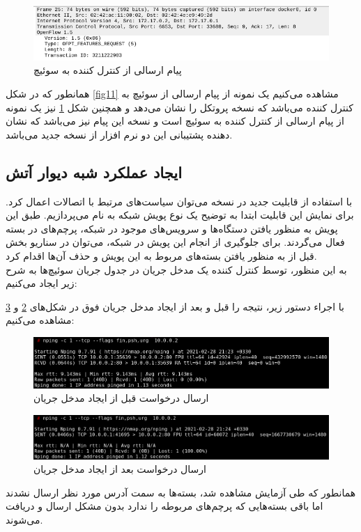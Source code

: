 \begin{figure}
	\centering
	\includegraphics[scale=0.5]{imgs/c_s_fr.png}
	\caption{پیام ارسالی  از کنترل کننده به سوئیچ}
	\label{fig12}
\end{figure}

همانطور که در شکل \ref{fig11} مشاهده می‌کنیم یک نمونه از پیام ارسالی از سوئیچ به کنترل کننده می‌باشد که نسخه پروتکل را  نشان می‌دهد و همچنین شکل \ref{fig12} نیز یک نمونه از پیام ارسالی از کنترل کننده به سوئیچ است و نسخه این پیام نیز  می‌باشد که نشان دهنده پشتیبانی این دو نرم افزار از نسخه جدید می‌باشد.

\subsection{ایجاد عملکرد شبه دیوار آتش}
با استفاده از قابلیت جدید  در نسخه  می‌توان سیاست‌های مرتبط با اتصالات  اعمال کرد. برای نمایش این قابلیت ابتدا به توضیح یک نوع پویش شبکه به نام  می‌پردازیم. طبق این پویش به منظور یافتن دستگاه‌ها و سرویس‌های موجود در شبکه، پرچم‌های  در بسته فعال می‌گردند. برای جلوگیری از انجام این پویش در شبکه، می‌توان در سناریو بخش قبل از  به منظور یافتن بسته‌های مربوط به این پویش و حذف آن‌ها اقدام کرد.\\
به این منظور، توسط کنترل کننده یک مدخل جریان در جدول جریان سوئیچ‌ها به شرح زیر ایجاد می‌کنیم:
\begin{flushleft}
\end{flushleft}
با اجراء دستور زیر، نتیجه را قبل و بعد از ایجاد مدخل جریان فوق در شکل‌های \ref{fig13} و \ref{fig14} مشاهده می‌کنیم:
\begin{flushleft}
\end{flushleft}

\begin{figure}
	\centering
	\includegraphics[scale=0.5]{imgs/tcp_b.png}
	\caption{ارسال درخواست قبل از ایجاد مدخل جریان}
	\label{fig13}
\end{figure}
\begin{figure}
	\centering
	\includegraphics[scale=0.5]{imgs/tcp_a.png}
	\caption{ارسال درخواست بعد از ایجاد مدخل جریان}
	\label{fig14}
\end{figure}

همانطور که طی آزمایش مشاهده شد، بسته‌ها به سمت آدرس مورد نظر ارسال نشدند اما باقی بسته‌هایی که پرچم‌های مربوطه را ندارد بدون مشکل ارسال و دریافت می‌شوند.







